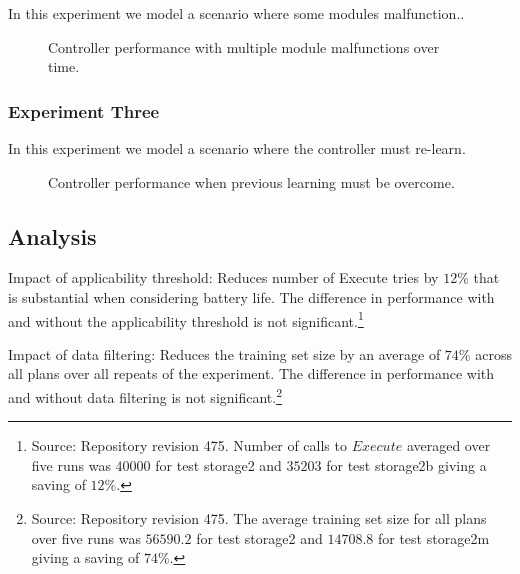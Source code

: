 In this experiment we model a scenario where some modules malfunction..

\begin{figure}[ht]
\begin{center}

\end{center}
\caption{Controller performance with multiple module malfunctions over time.}
\label{fig:experiment2}
\end{figure}

\subsubsection{Experiment Three}

In this experiment we model a scenario where the controller must re-learn.

\begin{figure}[ht]
\begin{center}

\end{center}
\caption{Controller performance when previous learning must be overcome.}
\label{fig:experiment3}
\end{figure}



\subsection{Analysis}\label{subsec:analysis}

Impact of applicability threshold: Reduces number of Execute tries by $12\%$ that is substantial when considering battery life. The difference in performance with and without the applicability threshold is not significant.\footnote{Source: Repository revision 475. Number of calls to $Execute$ averaged over five runs was $40000$ for test storage2 and $35203$ for test storage2b giving a saving of $12\%$.}

Impact of data filtering: Reduces the training set size by an average of $74\%$ across all plans over all repeats of the experiment. The difference in performance with and without data filtering is not significant.\footnote{Source: Repository revision 475. The average training set size for all plans over five runs was $56590.2$ for test storage2 and $14708.8$ for test storage2m giving a saving of $74\%$.}


